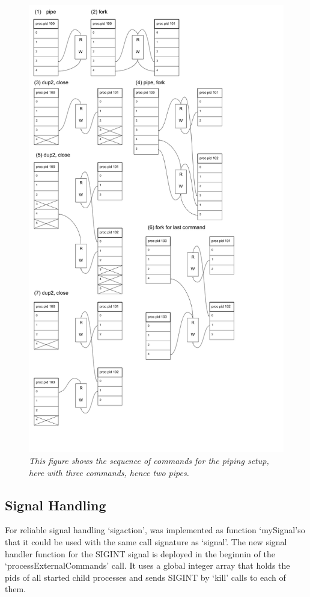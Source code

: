\documentclass[a4paper,11pt,twoside]{article}
\begin{document}
\begin{figure}
\centering
\includegraphics[width=\textwidth]{pipes.png}
\caption{\textit{This figure shows the sequence of commands for the
    piping setup, here with three commands, hence two pipes.}}
\label{fig:pipes}
\end{figure}

\subsection{Signal Handling}
For reliable signal handling `sigaction', was implemented as function `mySignal'so that it could be used with the same call signature as `signal'. The new signal handler function for the SIGINT signal is deployed in the beginnin of the `processExternalCommands' call. It uses a global integer array that holds the pids of all started child processes and sends SIGINT by `kill' calls to each of them.
\end{document}
